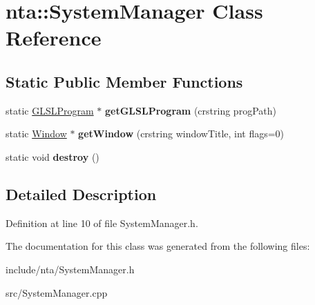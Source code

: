\hypertarget{classnta_1_1SystemManager}{}\section{nta\+:\+:System\+Manager Class Reference}
\label{classnta_1_1SystemManager}
\subsection*{Static Public Member Functions}
\begin{DoxyCompactItemize}
\item 
\mbox{\label{classnta_1_1SystemManager_af37be3ff4538da0a95b5ca257187077c}} 
static \hyperlink{classnta_1_1GLSLProgram}{G\+L\+S\+L\+Program} $\ast$ {\bfseries get\+G\+L\+S\+L\+Program} (crstring prog\+Path)
\item 
\mbox{\label{classnta_1_1SystemManager_af3577fda5a1a1019f51fbc352047dc1f}} 
static \hyperlink{classnta_1_1Window}{Window} $\ast$ {\bfseries get\+Window} (crstring window\+Title, int flags=0)
\item 
\mbox{\label{classnta_1_1SystemManager_a69721eaa78fda16f0f028d2991672282}} 
static void {\bfseries destroy} ()
\end{DoxyCompactItemize}


\subsection{Detailed Description}


Definition at line 10 of file System\+Manager.\+h.



The documentation for this class was generated from the following files\+:\begin{DoxyCompactItemize}
\item 
include/nta/System\+Manager.\+h\item 
src/System\+Manager.\+cpp\end{DoxyCompactItemize}
